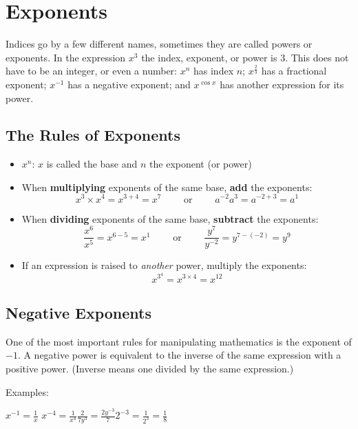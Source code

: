 \section*{Exponents}
Indices go by a few different names, sometimes they are called powers or exponents. In the expression $x^3$ the index, exponent, or power is $3$. This does not have to be an integer, or even a number: $x^n$ has index $n$; $x^{\frac{2}{3}}$ has a fractional exponent; $x^{-1}$ has a negative exponent; and $x^{\cos x}$ has another expression for its power.

\subsection*{The Rules of Exponents}
\begin{tcolorbox}
	\begin{itemize}
		\item $x^n$: $x$ is called the base and $n$ the exponent (or power)
		\item When \textbf{multiplying} exponents of the same base, \textbf{add} the exponents: \[x^3\times x^4=x^{3+4}=x^7\qquad\text{ or }\qquad a^{-2} a^3=a^{-2+3}=a^1\]
		\item When \textbf{dividing} exponents of the same base, \textbf{subtract} the exponents:\[\frac{x^6}{x^5}=x^{6-5}=x^1\qquad\text{ or }\qquad \frac{y^7}{y^{-2}}=y^{7-(-2)}=y^9\]
		\item If an expression is raised to \textit{another} power, multiply the exponents:
		\[ x^{3^4}=x^{3\times 4}=x^{12}\]
	\end{itemize}
\end{tcolorbox}

\subsection*{Negative Exponents}
One of the most important rules for manipulating mathematics is the exponent of $-1$. A negative power is equivalent to the inverse of the same expression with a positive power. (Inverse means one divided by the same expression.)\\

\begin{tcolorbox}
	Examples:

	\hspace{1cm}$\displaystyle x^{-1}=\frac{1}{x}$ \hspace{2cm}$\displaystyle x^{-4}=\frac{1}{x^4}$\hspace{2cm}$\displaystyle\frac{2}{7y^3}=\frac{2y^{-3}}{7} $\hspace{2cm}$\displaystyle 2^{-3}=\frac{1}{2^3}=\frac{1}{8} $
\end{tcolorbox}

